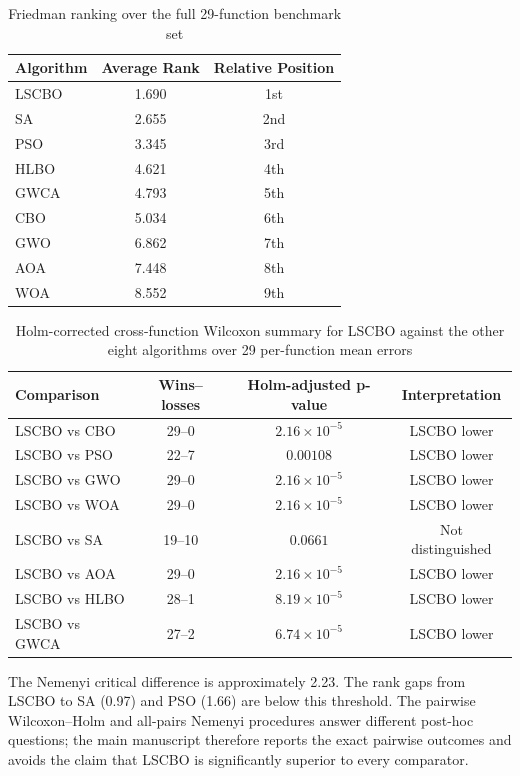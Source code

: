 \documentclass[11pt]{article}
\begin{document}
\begin{table}[htbp]
\centering
\caption{Friedman ranking over the full 29-function benchmark set}
\begin{tabular}{lcc}
\toprule
\textbf{Algorithm} & \textbf{Average Rank} & \textbf{Relative Position} \\
\midrule
LSCBO & 1.690 & 1st \\
SA & 2.655 & 2nd \\
PSO & 3.345 & 3rd \\
HLBO & 4.621 & 4th \\
GWCA & 4.793 & 5th \\
CBO & 5.034 & 6th \\
GWO & 6.862 & 7th \\
AOA & 7.448 & 8th \\
WOA & 8.552 & 9th \\
\bottomrule
\end{tabular}
\end{table}

\begin{table}[htbp]
\centering
\caption{Holm-corrected cross-function Wilcoxon summary for LSCBO against the other eight algorithms over 29 per-function mean errors}
\begin{tabular}{lccc}
\toprule
\textbf{Comparison} & \textbf{Wins--losses} & \textbf{Holm-adjusted p-value} & \textbf{Interpretation} \\
\midrule
LSCBO vs CBO & 29--0 & $2.16\times10^{-5}$ & LSCBO lower \\
LSCBO vs PSO & 22--7 & $0.00108$ & LSCBO lower \\
LSCBO vs GWO & 29--0 & $2.16\times10^{-5}$ & LSCBO lower \\
LSCBO vs WOA & 29--0 & $2.16\times10^{-5}$ & LSCBO lower \\
LSCBO vs SA & 19--10 & $0.0661$ & Not distinguished \\
LSCBO vs AOA & 29--0 & $2.16\times10^{-5}$ & LSCBO lower \\
LSCBO vs HLBO & 28--1 & $8.19\times10^{-5}$ & LSCBO lower \\
LSCBO vs GWCA & 27--2 & $6.74\times10^{-5}$ & LSCBO lower \\
\bottomrule
\end{tabular}
\end{table}

The Nemenyi critical difference is approximately 2.23. The rank gaps from LSCBO to SA (0.97) and PSO (1.66) are below this threshold. The pairwise Wilcoxon--Holm and all-pairs Nemenyi procedures answer different post-hoc questions; the main manuscript therefore reports the exact pairwise outcomes and avoids the claim that LSCBO is significantly superior to every comparator.
\end{document}
